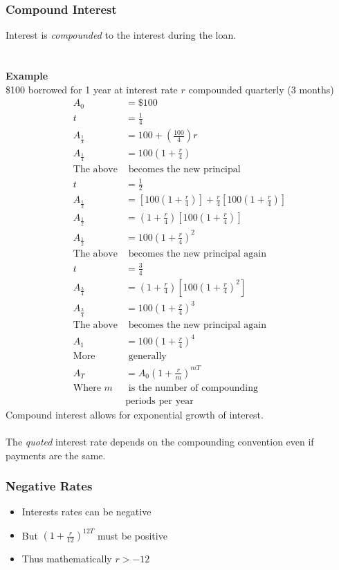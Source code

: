 \documentclass[12pt,letterpaper, twocolumn]{article}
\begin{document}
\subsubsection{Compound Interest}
Interest is \textit{compounded} to the interest during the loan. 
\\\\\\\textbf{Example}\\
\$100 borrowed for 1 year at interest rate $r$ compounded quarterly (3 months)
\begin{align*}
    A_0 &= \text{\$}100\\
    t &= \frac{1}{4}\\
    A_{\frac{1}{4}} &= 100 + (\frac{100}{4})r\\
    A_{\frac{1}{4}} &= 100(1 + \frac{r}{4})\\
    \text{The above}& \text{ becomes the new principal}\\
    t &= \frac{1}{2}\\
    A_{\frac{1}{2}} &= [100(1 + \frac{r}{4})] + \frac{r}{4}[100(1 + \frac{r}{4})]\\
    A_{\frac{1}{2}} &= (1 + \frac{r}{4})[100(1 + \frac{r}{4})]\\
    A_{\frac{1}{2}} &= 100(1 + \frac{r}{4})^2\\
    \text{The above}& \text{ becomes the new principal again}\\
    t &= \frac{3}{4}\\
    A_{\frac{3}{4}} &= (1 + \frac{r}{4})[100(1 + \frac{r}{4})^2]\\
    A_{\frac{3}{4}} &= 100(1 + \frac{r}{4})^3\\
    \text{The above}& \text{ becomes the new principal again}\\
    A_{1} &= 100(1 + \frac{r}{4})^4\\
    \text{More}&\text{ generally}\\
    A_T &= A_0(1+\frac{r}{m})^{mT}\\
    \text{Where $m$}& \text{ is the number of compounding} \\&\text{periods per year}
\end{align*}
Compound interest allows for exponential growth of interest. 
\\\\
The \textit{quoted} interest rate depends on the compounding convention even if payments are the same. 

\subsubsection{Negative Rates}
\begin{itemize}
    \item Interests rates can be negative
    \item But $(1+\frac{r}{12})^{12T}$ must be positive
    \item Thus mathematically $r>-12$
\end{itemize}
\end{document}
